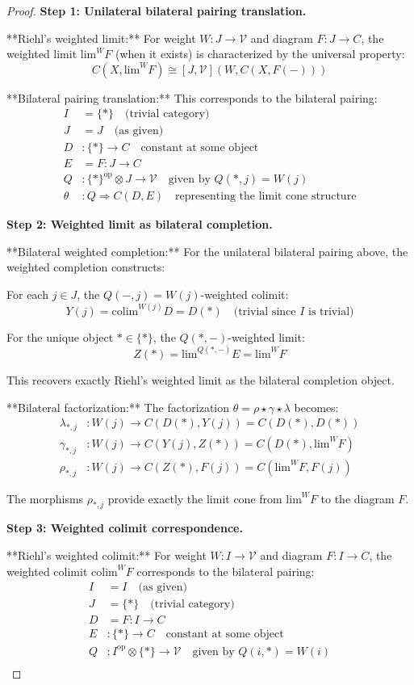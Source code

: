 \documentclass[11pt]{article}
\theoremstyle{plain}
\theoremstyle{definition}
\theoremstyle{remark}
\newcommand{\V}{\mathcal{V}}
\newcommand{\op}{\mathrm{op}}
\newcommand{\colim}{\mathrm{colim}}
\renewcommand{\lim}{\mathrm{lim}}
\begin{document}
\begin{proof}
\textbf{Step 1: Unilateral bilateral pairing translation.}

**Riehl's weighted limit:** For weight $W : J \to \V$ and diagram $F : J \to C$, the weighted limit $\lim^W F$ (when it exists) is characterized by the universal property:
$$C(X, \lim^W F) \cong [J, \V](W, C(X, F(-)))$$

**Bilateral pairing translation:** This corresponds to the bilateral pairing:
\begin{align}
I &= \{*\} \quad \text{(trivial category)} \\
J &= J \quad \text{(as given)} \\
D &: \{*\} \to C \quad \text{constant at some object} \\
E &= F : J \to C \\
Q &: \{*\}^{\op} \otimes J \to \V \quad \text{given by } Q(*, j) = W(j) \\
\theta &: Q \Rightarrow C(D, E) \quad \text{representing the limit cone structure}
\end{align}

\textbf{Step 2: Weighted limit as bilateral completion.}

**Bilateral weighted completion:** For the unilateral bilateral pairing above, the weighted completion constructs:

For each $j \in J$, the $Q(-, j) = W(j)$-weighted colimit:
$$Y(j) = \colim^{W(j)} D = D(*) \quad \text{(trivial since } I \text{ is trivial)}$$

For the unique object $* \in \{*\}$, the $Q(*, -)$-weighted limit:
$$Z(*) = \lim^{Q(*, -)} E = \lim^W F$$

This recovers exactly Riehl's weighted limit as the bilateral completion object.

**Bilateral factorization:** The factorization $\theta = \rho \star \gamma \star \lambda$ becomes:
\begin{align}
\lambda_{*,j} &: W(j) \to C(D(*), Y(j)) = C(D(*), D(*)) \\
\gamma_{*,j} &: W(j) \to C(Y(j), Z(*)) = C(D(*), \lim^W F) \\
\rho_{*,j} &: W(j) \to C(Z(*), F(j)) = C(\lim^W F, F(j))
\end{align}

The morphisms $\rho_{*,j}$ provide exactly the limit cone from $\lim^W F$ to the diagram $F$.

\textbf{Step 3: Weighted colimit correspondence.}

**Riehl's weighted colimit:** For weight $W : I \to \V$ and diagram $F : I \to C$, the weighted colimit $\colim^W F$ corresponds to the bilateral pairing:
\begin{align}
I &= I \quad \text{(as given)} \\
J &= \{*\} \quad \text{(trivial category)} \\
D &= F : I \to C \\
E &: \{*\} \to C \quad \text{constant at some object} \\
Q &: I^{\op} \otimes \{*\} \to \V \quad \text{given by } Q(i, *) = W(i) \\
\end{align}


\end{proof}
\end{document}
